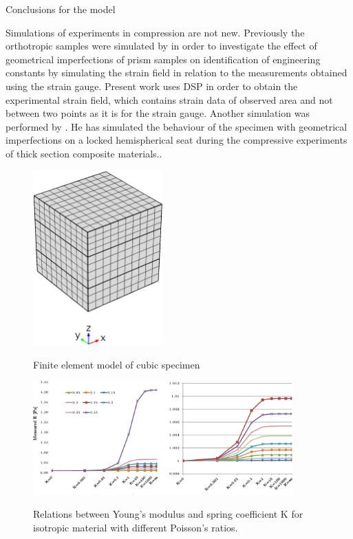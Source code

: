 \documentclass[review]{elsarticle}
\begin{document}
\begin{description}
\item[{\color {red}Conclusions for the model}]
\end{description}

Simulations of experiments in compression are not new. Previously the
orthotropic samples were simulated by \cite{Toftegaard1999849} in order to investigate the effect of
geometrical imperfections of prism samples on identification of engineering
constants by simulating the strain field in relation to the measurements
obtained using the strain gauge. 
Present work uses DSP in order to obtain the experimental strain field, which
contains strain data of observed area and not between two points as it is for the strain gauge. 
Another simulation was performed by \cite{Chen001}.
He has simulated the behaviour of the specimen with geometrical
imperfections on a locked hemispherical seat during the compressive experiments
of thick section composite materials..





\begin{figure}[h]
\centering
\includegraphics[width=5cm]{CubeFEM.eps}
\label{fig:cubemesh}
\caption{\label{fig:cubemesh} Finite element model of cubic specimen}
\end{figure}

\begin{figure}[h]
\centering
\includegraphics[width=10cm]{KIsotropBoth.eps}
\label{fig:cubemesh}
\caption{\label{fig:KIsotropic} Relations between Young's modulus and spring
coefficient K for isotropic material with different Poisson's ratios.}
\end{figure}
\end{document}
